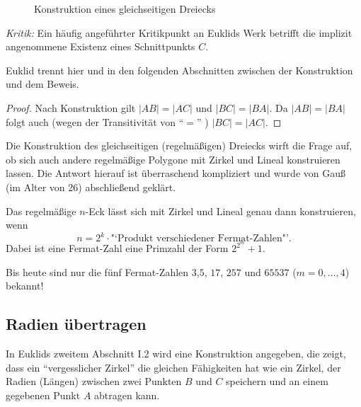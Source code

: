 \begin{figure}[h]
    
    \caption{Konstruktion eines gleichseitigen Dreiecks}
\end{figure}

{\em Kritik:} Ein häufig angeführter Kritikpunkt an Euklids Werk betrifft die implizit angenommene
Existenz eines Schnittpunkts $C$.


Euklid trennt hier und in den folgenden Abschnitten zwischen der Konstruktion und dem Beweis.

\begin{proof}
    Nach Konstruktion gilt $|AB|=|AC|$ und $|BC|=|BA|$.
    Da $|AB|=|BA|$ folgt auch (wegen der Transitivität von "`$=$"' ) $|BC|=|AC|$.
\end{proof}

Die Konstruktion des gleichseitigen (regelmäßigen) Dreiecks wirft die Frage auf, ob sich auch andere
regelmäßige Polygone mit Zirkel und Lineal konstruieren lassen. Die Antwort hierauf ist überraschend
kompliziert und wurde von Gauß (im Alter von 26)
abschließend geklärt.

\begin{thm}[Gauß, 1801]  %
    Das regelmäßige $n$-Eck lässt sich mit Zirkel und Lineal genau dann konstruieren, wenn
    $$
        n = 2^k \cdot \mbox{"`Produkt verschiedener Fermat-Zahlen"'}.
    $$
    Dabei ist eine Fermat-Zahl eine Primzahl der Form $2^{2^m}+1$.
\end{thm}

Bis heute sind nur die fünf Fermat-Zahlen $3$,$5$, $17$, $257$ und $65537$ ($m=0,\ldots,4$) bekannt!

\subsection*{Radien übertragen}

In Euklids zweitem Abschnitt I.2 wird eine Konstruktion angegeben, die zeigt, dass ein
"`vergesslicher Zirkel"' die gleichen Fähigkeiten hat wie ein Zirkel, der Radien (Längen) zwischen
zwei Punkten $B$ und $C$ speichern und an einem gegebenen Punkt $A$ abtragen kann.

